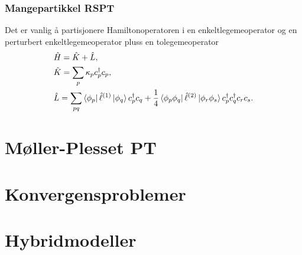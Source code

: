 \documentclass{beamer}
\begin{document}
\begin{frame}
	
	\frametitle{Mangepartikkel RSPT}

	Det er vanlig å partisjonere Hamiltonoperatoren i en enkeltlegemeoperator og en perturbert enkeltlegemeoperator pluss en tolegemeoperator
	\begin{align}
		&\hat H = \hat K + \hat L, \\
		&\hat K = \sum_p \kappa_p c^\dagger_p c_p, \\
		&\hat L = \sum_{pq} \bra{\phi_p} \hat \ell^{(1)}\ket{\phi_q}c^\dagger_p c_q + \frac{1}{4}\bra{\phi_p\phi_q}\hat \ell^{(2)} \ket{\phi_r\phi_s}c^\dagger_p c^\dagger_q c_r c_s.
	\end{align}		
		
\end{frame}

\section{Møller-Plesset PT}
\section{Konvergensproblemer}
\section{Hybridmodeller}
\end{document}
